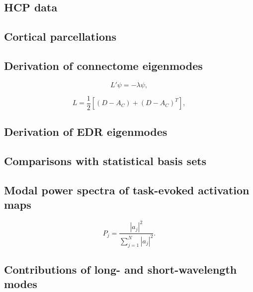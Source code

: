 \documentclass[sn-mathphys-num]{sn-jnl}%
\theoremstyle{thmstyleone}%
\theoremstyle{thmstyletwo}%
\theoremstyle{thmstylethree}%
\begin{document}
\subsection{HCP data} \label{sec:HCP_data}


\subsection{Cortical parcellations} \label{sec:cortical_parcellations}


\subsection{Derivation of connectome eigenmodes} \label{sec:connectome_derivation}

\begin{equation}\label{eq:connectome_eigenmodes}
	L' \psi = - \lambda \psi,
\end{equation}


\begin{equation}\label{eq:unnormalized_Laplacian}
	L = \frac{1}{2} [ (D-A_C) + (D-A_C)^T ],
\end{equation}


\subsection{Derivation of EDR eigenmodes} \label{sec:EDR_derivation}


\subsection{Comparisons with statistical basis sets} \label{sec:sets_comparisons}


\subsection{Modal power spectra of task-evoked activation maps} \label{sec:modal_power}


\begin{equation}\label{eq:normalized_power}
	P_j = \frac{|a_j|^2}{\sum_{j=1}^{N} |a_j|^2 }.
\end{equation}


\subsection{Contributions of long- and short-wavelength modes} \label{sec:wavelength_contributions}
\end{document}
